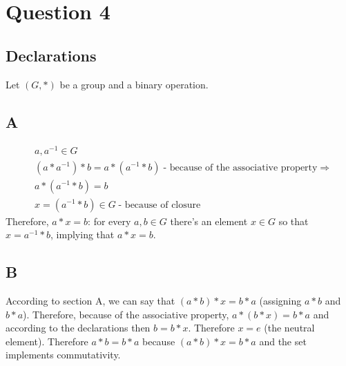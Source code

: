 \documentclass[12pt, oneside]{article}
\begin{document}
\section{Question 4}
\setcounter{subsection}{-1}
\subsection{Declarations}
Let $(G, *)$ be a group and a binary operation.

\subsection{A}
\begin{eqnarray*}
& a, a^{-1} \in G\\
& (a * a^{-1}) * b = a * (a^{-1} * b)\;\text{- because of the associative property} \Rightarrow\\
& a * (a^{-1} * b) = b\\
& x = (a^{-1} * b) \in G\;\text{- because of closure}
\end{eqnarray*}
Therefore, $a * x = b$: for every $a, b \in G$ there's an element $x \in G$ so that $x = a^{-1} * b$, implying that $a * x = b$.

\subsection{B}
According to section A, we can say that $(a * b) * x = b * a$ (assigning $a * b$ and $b * a$). Therefore, because of the associative property, $a * (b * x) = b * a$ and according to the declarations then $b = b * x$. Therefore $x = e$ (the neutral element). Therefore $a * b = b * a$ because $(a * b) * x = b * a$ and the set implements commutativity.
\end{document}
